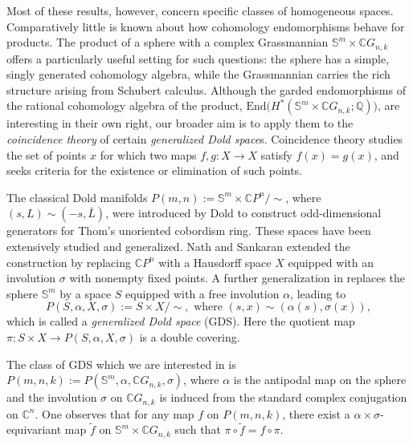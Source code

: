 \documentclass{amsart}
\begin{document}
	
	Most of these results, however, concern specific classes of homogeneous spaces.
	Comparatively little is known about how cohomology endomorphisms behave for
	products. The product of a sphere
	with a complex Grassmannian $\mathbb S^m\times \mathbb CG_{n,k}$ offers a particularly useful setting for such questions: the
	sphere has a simple, singly generated cohomology algebra, while the Grassmannian
	carries the rich structure arising from Schubert calculus.  
	Although the garded endomorphisms of the rational cohomology algebra of the product, $\mathrm{End}\big(H^*(\mathbb S^m\times \mathbb CG_{n,k};\mathbb Q)\big)$, are interesting in their own right, our broader aim is to apply them to the \textit{coincidence theory} of certain \textit{generalized Dold space}s.
	Coincidence theory studies the set of points $x$ for which two maps 
	$f,g : X \to X$ satisfy $f(x)=g(x)$, and seeks criteria for the 
	existence or elimination of such points. 
	
	
	The classical Dold manifolds $P(m,n):=\mathbb S^{m}\times\mathbb CP^{n}/\!\sim$, 
	where $(s,L)\sim(-s,\bar L)$, were introduced by Dold \cite{dold} to construct odd-dimensional generators for Thom's unoriented cobordism ring. These spaces have been extensively studied and generalized. Nath and Sankaran \cite{nath-sankaran} extended the construction by replacing $\mathbb CP^{n}$ with a Hausdorff space $X$ equipped with an involution $\sigma$ with nonempty fixed points. A further generalization in \cite{mandal-sankaran} replaces the sphere $\mathbb S^{m}$ by a space $S$ equipped with a free involution $\alpha$, leading to
	\[
	P(S,\alpha,X,\sigma):=S\times X/\!\sim,\text{ where } (s,x)\sim(\alpha(s),\sigma(x)),
	\]
	which is called a \emph{generalized Dold space} (GDS).
	Here the quotient map $\pi: S\times X\to P(S,\alpha,X,\sigma)$ is a double covering.
	
	
	The class of GDS which we are interested in is $P(m,n,k):=P(\mathbb S^m,\alpha,\mathbb CG_{n,k},\sigma)$, where $\alpha $ is the antipodal map on the sphere and the involution $\sigma$ on $\mathbb CG_{n,k}$ is induced from the standard complex conjugation on $\mathbb C^n$. One observes that for any map $f$ on $P(m,n,k)$, there exist a $\alpha\times \sigma$-equivariant map $\tilde f$ on $\mathbb S^m\times\mathbb CG_{n,k}$ such that $\pi\circ \tilde f=f\circ \pi.$
	
\end{document}
